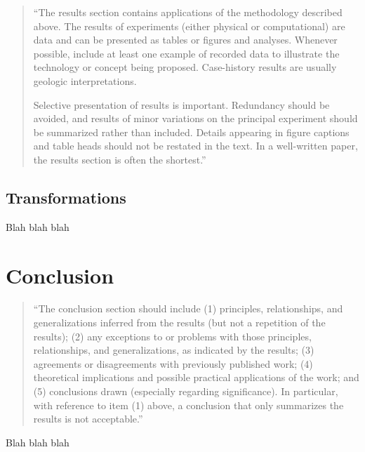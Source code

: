 \documentclass[]{report}   %
\begin{document}
\begin{quotation}
	``The results section contains applications of the methodology described above. The results of experiments
	(either physical or computational) are data and can be presented as tables or figures and analyses. Whenever
	possible, include at least one example of recorded data to illustrate the technology or concept being proposed.
	Case-history results are usually geologic interpretations.

	Selective presentation of results is important. Redundancy should be avoided, and results of minor variations on
	the principal experiment should be summarized rather than included. Details appearing in figure captions and
	table heads should not be restated in the text. In a well-written paper, the results section is often the
	shortest.''
\end{quotation}


\section{Transformations}



Blah blah blah





\chapter{Conclusion}		%

\begin{quotation}
	``The conclusion section should include (1) principles, relationships, and generalizations inferred from the
	results (but not a repetition of the results); (2) any exceptions to or problems with those principles,
	relationships, and generalizations, as indicated by the results; (3) agreements or disagreements with previously
	published work; (4) theoretical implications and possible practical applications of the work; and (5) conclusions
	drawn (especially regarding significance). In particular, with reference to item (1) above, a conclusion that
	only summarizes the results is not acceptable.''
\end{quotation}


Blah blah blah






\begin{thebibliography}{9}
\end{thebibliography}
\end{document}
